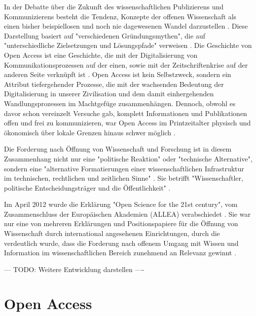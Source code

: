In der Debatte über die Zukunft des wissenschaftlichen Publizierens und Kommunizierens besteht die Tendenz, Konzepte der offenen Wissenschaft als einen bisher beispiellosen und noch nie dagewesenen Wandel darzustellen \cite{cite:17a} \cite{cite:17b}. Diese Darstellung basiert auf "verschiedenen Gründungsmythen", die auf "unterschiedliche Zielsetzungen und Lösungspfade" verweisen \cite{suchen-Hoffmann-Zugang-undVerwertung-öffentlicher-Informationen}. Die Geschichte von Open Access ist eine Geschichte, die mit der Digitalisierung von Kommunikationsprozessen \cite{albert_2006_open_implications} auf der einen, sowie mit der Zeitschriftenkrise auf der anderen Seite verknüpft ist \cite{suchen-Hoffmann-Zugang-undVerwertung-öffentlicher-Informationen}. Open Access ist kein Selbstzweck\cite{cite:17d}, sondern ein Attribut tiefergehender Prozesse, die mit der wachsenden Bedeutung der Digitalisierung in unserer Zivilisation und dem damit einhergehenden Wandlungsprozessen im Machtgefüge zusammenhängen\cite{cite:17e}. Dennoch, obwohl es davor schon vereinzelt Versuche gab, komplett Informationen und Publikationen offen und frei zu kommunizieren, war Open Access im Printzeitalter physisch und ökonomisch über lokale Grenzen hinaus schwer möglich \cite{cite:18a}.

Die Forderung nach Öffnung von Wissenschaft und Forschung ist in diesem Zusammenhang nicht nur eine "politische Reaktion" oder "technische Alternative", sondern eine "alternative Formatierungen einer wissenschaftlichen Infrastruktur im technischen, rechtlichen und zeitlichen Sinne" \cite{kelty_2004}. Sie betrifft "Wissenschaftler, politische Entscheidungsträger und die Öffentlichkeit" \cite{Scheliga_2014}.

Im April 2012 wurde die Erklärung "Open Science for the 21st century", vom Zusammenschluss der Europäischen Akademien (ALLEA) verabschiedet \cite{ALLEA_2012}. Sie war nur eine von mehreren Erklärungen und Positionspapiere für die Öffnung von Wissenschaft durch international angesehenen Einrichtungen, durch die verdeutlich wurde, dass die Forderung nach offenem Umgang mit Wissen und Information im wissenschaftlichen Bereich zunehmend an Relevanz gewinnt \cite{schulze_2013_open}.

--- TODO: Weitere Entwicklung darstellen ----

\section{Open Access}

